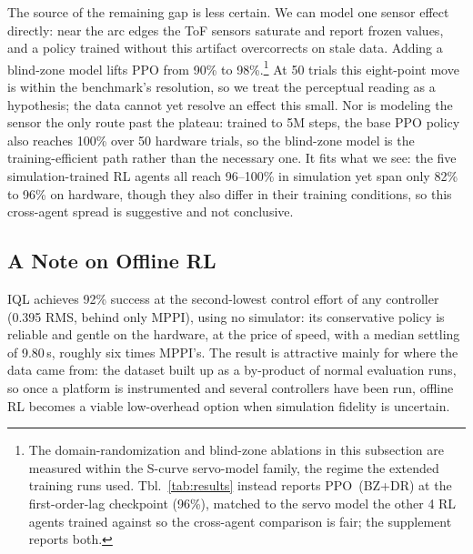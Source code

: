 The source of the remaining gap is less certain.
We can model one sensor effect directly: near the arc edges the ToF sensors saturate and report frozen values, and a policy trained without this artifact overcorrects on stale data.
Adding a blind-zone model lifts PPO from 90\% to 98\%.\footnote{The domain-randomization and blind-zone ablations in this subsection are measured within the S-curve servo-model family, the regime the extended training runs used. Tbl.~\ref{tab:results} instead reports PPO~(BZ+DR) at the first-order-lag checkpoint (96\%), matched to the servo model the other 4 RL agents trained against so the cross-agent comparison is fair; the supplement reports both.} At 50 trials this eight-point move is within the benchmark's resolution, so we treat the perceptual reading as a hypothesis; the data cannot yet resolve an effect this small.
Nor is modeling the sensor the only route past the plateau: trained to 5M steps, the base PPO policy also reaches 100\% over 50 hardware trials, so the blind-zone model is the training-efficient path rather than the necessary one.
It fits what we see: the five simulation-trained RL agents all reach 96--100\% in simulation yet span only 82\% to 96\% on hardware, though they also differ in their training conditions, so this cross-agent spread is suggestive and not conclusive.

\subsection{A Note on Offline RL}

IQL achieves 92\% success at the second-lowest control effort of any controller (0.395 RMS, behind only MPPI), using no simulator: its conservative policy is reliable and gentle on the hardware, at the price of speed, with a median settling of 9.80\,s, roughly six times MPPI's.
The result is attractive mainly for where the data came from: the dataset built up as a by-product of normal evaluation runs, so once a platform is instrumented and several controllers have been run, offline RL becomes a viable low-overhead option when simulation fidelity is uncertain.
